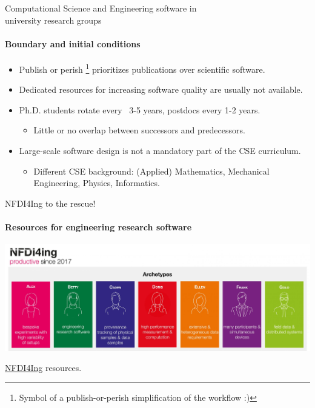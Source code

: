 

\begin{frame}{Computational Science and Engineering software in\\university research groups}
	\framesubtitle{Boundary and initial conditions}
	
	\vfill
	\begin{itemize}
            \item Publish or perish \faGraduationCap\footnote{Symbol of a publish-or-perish simplification of the workflow :)} prioritizes publications over scientific software.
		\item Dedicated resources for increasing software quality are usually not available.
		\item Ph.D. students rotate every ~3-5 years, postdocs every 1-2 years. 
			\begin{itemize}
				\item Little or no overlap between successors and predecessors. 
			\end{itemize}
		\item Large-scale software design is not a mandatory part of the CSE curriculum. 
			\begin{itemize}
				\item Different CSE background: (Applied) Mathematics, Mechanical Engineering, Physics, Informatics.
			\end{itemize}
	\end{itemize}
\end{frame}

\begin{frame}{NFDI4Ing to the rescue!}
\framesubtitle{Resources for engineering research software}
    \vfill

    \begin{center}
    \includegraphics[width=\textwidth]{figures/nfdi4ing.jpg}
    \end{center}
    \href{https://nfdi4ing.de}{NFDI4Ing} resources. 

\end{frame}

